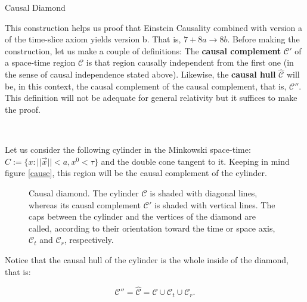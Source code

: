 \documentclass[12pt]{article}
\begin{document}
\begin{section}{Causal Diamond}

This construction helps us proof that Einstein Causality combined with version a of the time-slice axiom yields version b. That is, $7+8a \rightarrow 8b$. Before making the construction, let us make a couple of definitions: The \textbf{causal complement} $\mathcal{C}'$ of a space-time region $\mathcal{C}$ is that region causally independent from the first one (in the sense of causal independence stated above). Likewise, the \textbf{causal hull} $\hat{\mathcal{C}}$ will be, in this context, the causal complement of the causal complement, that is, $\mathcal{C}''$. This definition will not be adequate for general relativity but it suffices to make the proof.

\

Let us consider the following cylinder in the Minkowski space-time: $C:=\{ x: ||\vec{x}||<a , x^0 < \tau \}$ and the double cone tangent to it. Keeping in mind figure \ref{cause}, this region will be the causal complement of the cylinder.

\begin{figure}[H]
\centering
{}
\caption{Causal diamond. The cylinder $\mathcal{C}$ is shaded with diagonal lines, whereas its causal complement $\mathcal{C}'$ is shaded with vertical lines. The caps between the cylinder and the vertices of the diamond are called, according to their orientation toward the time or space axis, $\mathcal{C}_t$ and $\mathcal{C}_r$, respectively.}
\label{diamond}
\end{figure}

Notice that the causal hull of the cylinder is the whole inside of the diamond, that is:

\begin{equation}\label{1}
\mathcal{C}''=\hat{\mathcal{C}}=\mathcal{C} \cup \mathcal{C}_t \cup \mathcal{C}_r.
\end{equation}


\end{section}
\end{document}
